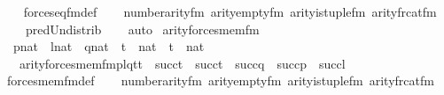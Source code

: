 \begin{isabellebody}
%
\isadelimproof
\ \ %
\endisadelimproof
%
\isatagproof
{}\isamarkupfalse%
\ forces{\isacharunderscore}{\kern0pt}eq{\isacharunderscore}{\kern0pt}fm{\isacharunderscore}{\kern0pt}def\isanewline
\ \ \isamarkupfalse%
\ number{}arity{\isacharunderscore}{\kern0pt}{\isacharunderscore}{\kern0pt}fm\ arity{\isacharunderscore}{\kern0pt}empty{\isacharunderscore}{\kern0pt}fm\ arity{\isacharunderscore}{\kern0pt}is{\isacharunderscore}{\kern0pt}tuple{\isacharunderscore}{\kern0pt}fm\ arity{\isacharunderscore}{\kern0pt}frc{\isacharunderscore}{\kern0pt}at{\isacharunderscore}{\kern0pt}fm\isanewline
\ \ \ \ pred{\isacharunderscore}{\kern0pt}Un{\isacharunderscore}{\kern0pt}distrib\isanewline
\ \ \isamarkupfalse%
\ auto%
\endisatagproof
{\isafoldproof}%
%
\isadelimproof
\isanewline
%
\endisadelimproof
\isanewline
{}\isamarkupfalse%
\ arity{\isacharunderscore}{\kern0pt}forces{\isacharunderscore}{\kern0pt}mem{\isacharunderscore}{\kern0pt}fm\ {\isacharcolon}{\kern0pt}\isanewline
\ \ {\isachardoublequoteopen}p{\isasymin}nat\ {\isasymLongrightarrow}\ l{\isasymin}nat\ {\isasymLongrightarrow}\ q{\isasymin}nat\ {\isasymLongrightarrow}\ t{}\ {\isasymin}\ nat\ {\isasymLongrightarrow}\ t{}\ {\isasymin}\ nat\ {\isasymLongrightarrow}\isanewline
\ \ \ arity{\isacharparenleft}{\kern0pt}forces{\isacharunderscore}{\kern0pt}mem{\isacharunderscore}{\kern0pt}fm{\isacharparenleft}{\kern0pt}p{\isacharcomma}{\kern0pt}l{\isacharcomma}{\kern0pt}q{\isacharcomma}{\kern0pt}t{}{\isacharcomma}{\kern0pt}t{}{\isacharparenright}{\kern0pt}{\isacharparenright}{\kern0pt}\ {\isacharequal}{\kern0pt}\ succ{\isacharparenleft}{\kern0pt}t{}{\isacharparenright}{\kern0pt}\ {\isasymunion}\ succ{\isacharparenleft}{\kern0pt}t{}{\isacharparenright}{\kern0pt}\ {\isasymunion}\ succ{\isacharparenleft}{\kern0pt}q{\isacharparenright}{\kern0pt}\ {\isasymunion}\ succ{\isacharparenleft}{\kern0pt}p{\isacharparenright}{\kern0pt}\ {\isasymunion}\ succ{\isacharparenleft}{\kern0pt}l{\isacharparenright}{\kern0pt}{\isachardoublequoteclose}\isanewline
%
\isadelimproof
\ \ %
\endisadelimproof
%
\isatagproof
{}\isamarkupfalse%
\ forces{\isacharunderscore}{\kern0pt}mem{\isacharunderscore}{\kern0pt}fm{\isacharunderscore}{\kern0pt}def\isanewline
\ \ \isamarkupfalse%
\ number{}arity{\isacharunderscore}{\kern0pt}{\isacharunderscore}{\kern0pt}fm\ arity{\isacharunderscore}{\kern0pt}empty{\isacharunderscore}{\kern0pt}fm\ arity{\isacharunderscore}{\kern0pt}is{\isacharunderscore}{\kern0pt}tuple{\isacharunderscore}{\kern0pt}fm\ arity{\isacharunderscore}{\kern0pt}frc{\isacharunderscore}{\kern0pt}at{\isacharunderscore}{\kern0pt}fm\isanewline

\end{isabellebody}
